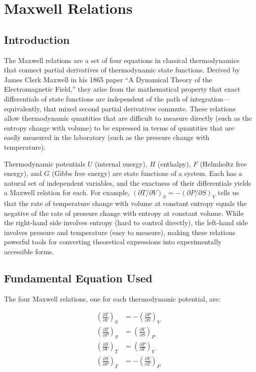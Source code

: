 \chapter{Maxwell Relations}

\section*{Introduction}

The Maxwell relations are a set of four equations in classical thermodynamics that connect partial derivatives of thermodynamic state functions. Derived by James Clerk Maxwell in his 1865 paper ``A Dynamical Theory of the Electromagnetic Field,'' they arise from the mathematical property that exact differentials of state functions are independent of the path of integration---equivalently, that mixed second partial derivatives commute. These relations allow thermodynamic quantities that are difficult to measure directly (such as the entropy change with volume) to be expressed in terms of quantities that are easily measured in the laboratory (such as the pressure change with temperature).

Thermodynamic potentials $U$ (internal energy), $H$ (enthalpy), $F$ (Helmholtz free energy), and $G$ (Gibbs free energy) are state functions of a system. Each has a natural set of independent variables, and the exactness of their differentials yields a Maxwell relation for each. For example, $(\partial T/\partial V)_{S} = -(\partial P/\partial S)_{V}$ tells us that the rate of temperature change with volume at constant entropy equals the negative of the rate of pressure change with entropy at constant volume. While the right-hand side involves entropy (hard to control directly), the left-hand side involves pressure and temperature (easy to measure), making these relations powerful tools for converting theoretical expressions into experimentally accessible forms.
\section*{Fundamental Equation Used}

The four Maxwell relations, one for each thermodynamic potential, are:

\begin{align}
\left(\frac{\partial T}{\partial V}\right)_{S} &= -\left(\frac{\partial P}{\partial S}\right)_{V}
\label{eq:maxwell1} \\
\left(\frac{\partial T}{\partial P}\right)_{S} &= \left(\frac{\partial V}{\partial S}\right)_{P}
\label{eq:maxwell2} \\
\left(\frac{\partial S}{\partial V}\right)_{T} &= \left(\frac{\partial P}{\partial T}\right)_{V}
\label{eq:maxwell3} \\
\left(\frac{\partial S}{\partial P}\right)_{T} &= -\left(\frac{\partial V}{\partial T}\right)_{P}
\label{eq:maxwell4}
\end{align}
